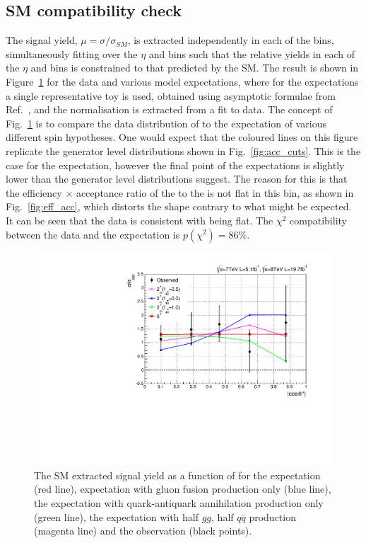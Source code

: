 \subsection{SM compatibility check}
The signal yield, $\mu=\sigma/\sigma_{SM}$, is extracted independently in each of the \abscostheta bins, 
simultaneously fitting over the $\eta$ and \rnine bins such that the relative yields in each of the $\eta$ and \rnine 
bins is constrained to that predicted by the SM. The result is shown in Figure~\ref{fig:channelcomp} for the data and various \twomp model expectations, where for the expectations a single representative toy is used, obtained using asymptotic formulae from Ref.~\cite{asymptotic_form}, and the normalisation is extracted from a fit to data. The concept of Fig.~\ref{fig:channelcomp} is to compare the data distribution of \abscostheta to the expectation of various different spin hypotheses. One would expect that the coloured lines on this figure replicate the generator level distributions shown in Fig.~\ref{fig:acc_cuts}. This is the case for the \SM \zerop expectation, however the final point of the \twomp expectations is slightly lower than the generator level distributions suggest. The reason for this is that the efficiency $\times$ acceptance ratio of the \zerop to the \twomp is not flat in this bin, as shown in Fig.~\ref{fig:eff_acc}, which distorts the shape contrary to what might be expected. It can be seen that the data is consistent with being flat. The $\chi^{2}$ compatibility between the data and the \SM expectation is $p(\chi^{2})=86\%$.

\begin{figure}
  \begin{center}
    \includegraphics[width=0.8\linewidth]{results/plots/chcomp.pdf}
    \caption[The \acs{SM} signal strength extraction in bins of \abscostheta for the spin analysis]{The SM extracted signal yield as a function of \abscostheta for the \zerop expectation (red line), \twomp expectation with gluon fusion production only (blue line), the \twomp expectation with quark-antiquark annihilation production only (green line), the \twomp expectation with half $gg$, half $q\bar{q}$ production (magenta line) and the observation (black points).}
    \label{fig:channelcomp}
  \end{center}
\end{figure}

